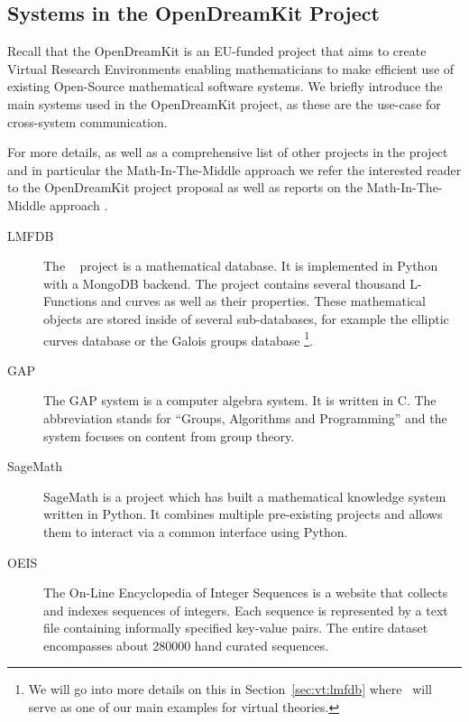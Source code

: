 \subsection{Systems in the OpenDreamKit Project}\label{sec:mitm:systems}


Recall that the OpenDreamKit \cite{OpenDreamKit:on} is an EU-funded project that aims to create Virtual Research Environments enabling mathematicians to make efficient use of existing Open-Source mathematical software systems.
We briefly introduce the main systems used in the OpenDreamKit project, as these are the use-case for cross-system communication. 

For more details, as well as a comprehensive list of other projects in the project and in particular the Math-In-The-Middle approach we refer the interested reader to the OpenDreamKit project proposal \cite{ODKproposal:on} as well as reports on the Math-In-The-Middle approach \cite{DehKohKon:iop16}.

\begin{description}
  \item[LMFDB]
    The \lmfdb\ \cite{lmfdb} project is a mathematical database. 
    It is implemented in Python with a MongoDB backend. 
    The project contains several thousand L-Functions and curves as well as their properties.
    These mathematical objects are stored inside of several sub-databases, for example the elliptic curves database or the Galois groups database
    \footnote{We will go into more details on this in Section~\ref{sec:vt:lmfdb} where \lmfdb\ will serve as one of our main examples for virtual theories. }. 
  \item[GAP]
    The GAP system \cite{gap} is a computer algebra system. 
    It is written in C. 
    The abbreviation stands for ``Groups, Algorithms and Programming'' and the system focuses on content from group theory. 
  \item[SageMath]
    SageMath \cite{sagemath} is a project which has built a mathematical knowledge system written in Python. 
    It combines multiple pre-existing projects and allows them to interact via a common interface using Python. 
  \item[OEIS]
    The On-Line Encyclopedia of Integer Sequences \cite{oeis} is a website that collects and indexes sequences of integers. 
    Each sequence is represented by a text file containing informally specified key-value pairs. 
    The entire dataset encompasses about 280000 hand curated sequences. 
\end{description}

